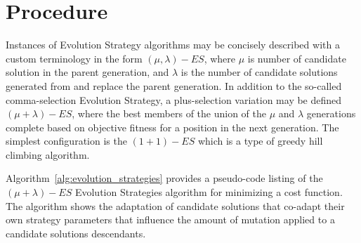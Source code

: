\documentclass[a4paper, 11pt]{article}
\begin{document}
\section{Procedure}
\label{sec:procedure}
Instances of Evolution Strategy algorithms may be concisely described with a custom terminology in the form $(\mu,\lambda)-ES$, where $\mu$ is number of candidate solution in the parent generation, and $\lambda$ is the number of candidate solutions generated from and replace the parent generation. In addition to the so-called comma-selection Evolution Strategy, a plus-selection variation may be defined $(\mu + \lambda)-ES$, where the best members of the union of the $\mu$ and $\lambda$ generations complete based on objective fitness for a position in the next generation. The simplest configuration is the $(1+1)-ES$ which is a type of greedy hill climbing algorithm.

Algorithm~\ref{alg:evolution_strategies} provides a pseudo-code listing of the $(\mu+\lambda)-ES$ Evolution Strategies algorithm for minimizing a cost function. The algorithm shows the adaptation of candidate solutions that co-adapt their own strategy parameters that influence the amount of mutation applied to a candidate solutions descendants. 
\end{document}
